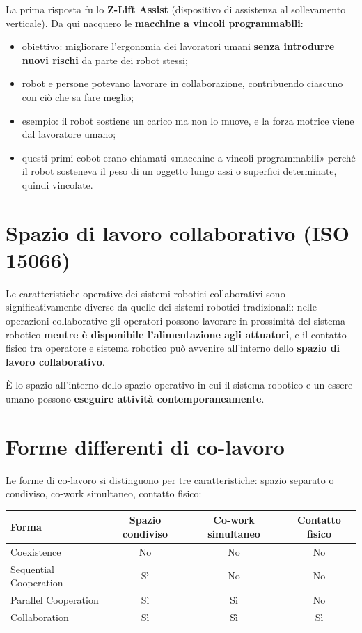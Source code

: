 La prima risposta fu lo \textbf{Z-Lift Assist} (dispositivo di assistenza al sollevamento verticale). Da qui nacquero le \textbf{macchine a vincoli programmabili}:
\begin{itemize}
    \item obiettivo: migliorare l'ergonomia dei lavoratori umani \textbf{senza introdurre nuovi rischi} da parte dei robot stessi;
    \item robot e persone potevano lavorare in collaborazione, contribuendo ciascuno con ciò che sa fare meglio;
    \item esempio: il robot sostiene un carico ma non lo muove, e la forza motrice viene dal lavoratore umano;
    \item questi primi cobot erano chiamati «macchine a vincoli programmabili» perché il robot sosteneva il peso di un oggetto lungo assi o superfici determinate, quindi vincolate.
\end{itemize}

\section{Spazio di lavoro collaborativo (ISO 15066)}
Le caratteristiche operative dei sistemi robotici collaborativi sono significativamente diverse da quelle dei sistemi robotici tradizionali: nelle operazioni collaborative gli operatori possono lavorare in prossimità del sistema robotico \textbf{mentre è disponibile l'alimentazione agli attuatori}, e il contatto fisico tra operatore e sistema robotico può avvenire all'interno dello \textbf{spazio di lavoro collaborativo}.

\begin{defn}
È lo spazio all'interno dello spazio operativo in cui il sistema robotico e un essere umano possono \textbf{eseguire attività contemporaneamente}.
\end{defn}

\section{Forme differenti di co-lavoro}
Le forme di co-lavoro si distinguono per tre caratteristiche: spazio separato o condiviso, co-work simultaneo, contatto fisico:
\begin{center}
\begin{tabular}{lccc}
\textbf{Forma} & \textbf{Spazio condiviso} & \textbf{Co-work simultaneo} & \textbf{Contatto fisico}\\
\hline
Coexistence & No & No & No\\
Sequential Cooperation & Sì & No & No\\
Parallel Cooperation & Sì & Sì & No\\
Collaboration & Sì & Sì & Sì\\
\end{tabular}
\end{center}

